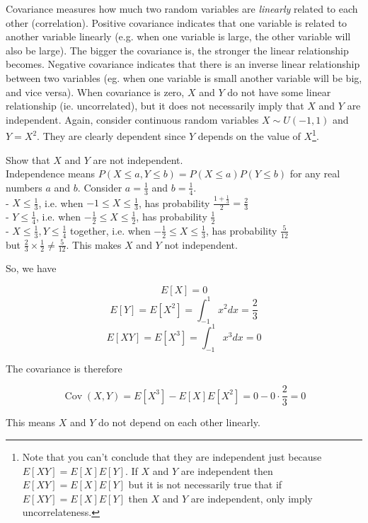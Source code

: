 \documentclass[12pt, a4paper]{article}
\newcounter{exa}
\newcommand{\Cov}{\operatorname{Cov}}
\begin{document}
Covariance measures how much two random variables are \textit{linearly} related to each other (correlation). Positive covariance indicates that one variable is related to another variable linearly (e.g. when one variable is large, the other variable will also be large). The bigger the covariance is, the stronger the linear relationship becomes. Negative covariance indicates that there is an inverse linear relationship between two variables (eg. when one variable is small another variable will be big, and vice versa). When covariance is zero, $X$ and $Y$ do not have some linear relationship (ie. uncorrelated), but it does not necessarily imply that $X$ and $Y$ are independent. Again, consider continuous random variables $X \sim U(-1,1)$ and $Y=X^2$. They are clearly dependent since $Y$ depends on the value of $X$\footnote{Note that you can't conclude that they are independent just because $E[XY]=E[X]E[Y]$. If $X$ and $Y$ are independent then $E[XY]=E[X]E[Y]$ but it is not necessarily true that if $E[XY]=E[X]E[Y]$ then $X$ and $Y$ are independent, only imply uncorrelateness.}.

\begin{texample}
Show that $X$ and $Y$ are not independent. \\

Independence means $P(X\le a, Y\le b)=P(X\le a) P(Y\le b)$ for any real numbers $a$ and $b$. Consider $a=\frac13$ and $b=\frac 14$. \\

- $X \le \frac 13$, i.e. when $-1 \le X \le \frac13$, has probability $\frac{1+\frac13}{2}=\frac23$ \\
- $Y \le \frac 14$, i.e. when $-\frac12 \le X \le \frac12$, has probability $\frac12$ \\
- $X \le \frac 13, Y \le \frac 14$ together, i.e. when $-\frac12 \le X \le \frac13$, has probability $\frac5{12}$ \\

but $\frac23 \times \frac12 \not=\frac5{12}$. This makes $X$ and $Y$ not independent.
\end{texample}

So, we have

$$E[X] = 0$$
$$E[Y] = E[X^2] = \int_{-1}^{1} x^2  dx = \frac23$$
$$E[XY] = E[X^3] = \int_{-1}^{1} x^3 dx = 0$$

The covariance is therefore

\[ \Cov(X,Y) = E[X^3] - E[X] E[X^2] = 0 - 0 \cdot \frac23 = 0 \]

This means $X$ and $Y$ do not depend on each other linearly.
\end{document}
